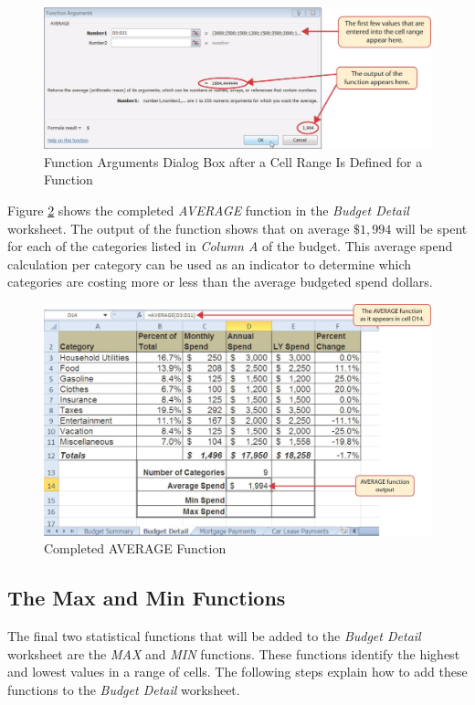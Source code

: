 \begin{figure}[H]
	\centering
	\includegraphics[width=\maxwidth{.95\linewidth}]{gfx/ch02_fig22}
	\caption{Function Arguments Dialog Box after a Cell Range Is Defined for a Function}
	\label{02:fig22}
\end{figure}

Figure \ref{02:fig23} shows the completed \textit{AVERAGE} function in the \textit{Budget Detail} worksheet. The output of the function shows that on average $ \$1,994 $ will be spent for each of the categories listed in \textit{Column A} of the budget. This average spend calculation per category can be used as an indicator to determine which categories are costing more or less than the average budgeted spend dollars.

\begin{figure}[H]
	\centering
	\includegraphics[width=\maxwidth{.95\linewidth}]{gfx/ch02_fig23}
	\caption{Completed AVERAGE Function}
	\label{02:fig23}
\end{figure}

\subsection{The Max and Min Functions}

The final two statistical functions that will be added to the \textit{Budget Detail} worksheet are the \textit{MAX} and \textit{MIN} functions. These functions identify the highest and lowest values in a range of cells. The following steps explain how to add these functions to the \textit{Budget Detail} worksheet.

